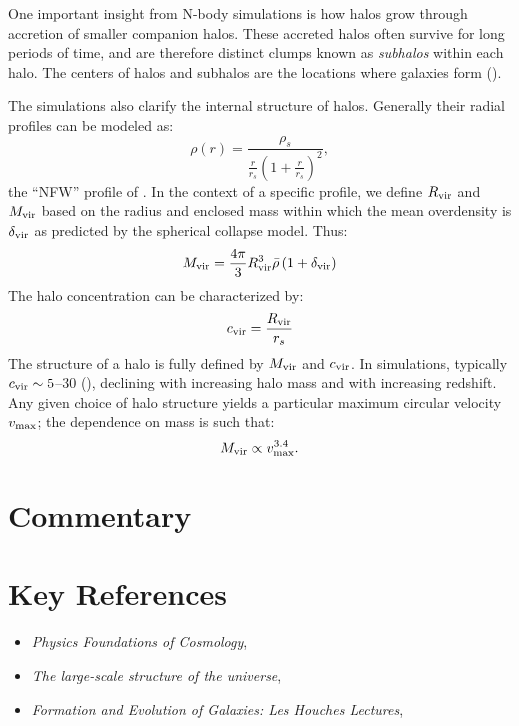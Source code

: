 One important insight from N-body simulations is how halos grow through
accretion of smaller companion halos. These accreted halos often
survive for long periods of time, and are therefore distinct clumps
known as {\it subhalos} within each halo. The centers of halos and
subhalos are the locations where galaxies form (\citealt{wechsler18a}).

The simulations also clarify the internal structure of
halos. Generally their radial profiles can be modeled as:
\begin{equation}
\rho(r) = \frac{\rho_s}{\frac{r}{r_s}\left(1
+ \frac{r}{r_s}\right)^2},
\end{equation}
the ``NFW'' profile of \citet{navarro97a}. In the context of a
specific profile, we define $R_{\rm vir}$ and $M_{\rm vir}$ based on
the radius and enclosed mass within which the mean overdensity is
$\delta_{\rm vir}$ as predicted by the spherical collapse model. Thus:
\begin{equation}
M_{\rm vir} = \frac{4\pi}{3} R_{\rm vir}^3 \bar\rho \left(1+ \delta_{\rm
vir}\right)
\end{equation}
The halo concentration can be characterized by:
\begin{equation}
c_{\rm vir} = \frac{R_{\rm vir}}{r_s}
\end{equation}
The structure of a halo is fully defined by $M_{\rm vir}$ and $c_{\rm
vir}$. In simulations, typically $c_{\rm vir} \sim 5$--$30$
(\citealt{bullock01b, wang20a}), declining with increasing halo mass
and with increasing redshift. Any given choice of halo structure
yields a particular maximum circular velocity $v_{\rm max}$; the
dependence on mass is such that:
\begin{equation}
M_{\rm vir} \propto v_{\rm max}^{3.4}.
\end{equation}

\section{Commentary}


\section{Key References}

\begin{itemize}
  \item
    {\it Physics Foundations of Cosmology},
    \citet{mukhanov05a}
  \item
    {\it The large-scale structure of the
    universe}, \citet{peebles80a}
  \item
    {\it Formation and Evolution of Galaxies: Les Houches
    Lectures}, \citet{white94a} 
\end{itemize}

